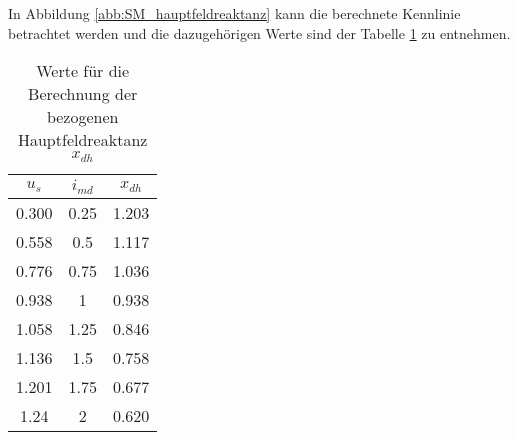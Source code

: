 In Abbildung \ref{abb:SM_hauptfeldreaktanz} kann die berechnete Kennlinie betrachtet werden und die dazugehörigen Werte sind der Tabelle \ref{tab:Hauptfeldreaktanz} zu entnehmen.



\begin{table}[!ht]
\centering
\begin{tabular}{|c|c|c|}
\hline
$u_s$    & $i_{md}$    & $x_{dh}$  \\ \hline
0.300    & 0.25     & 1.203     \\ \hline
0.558    & 0.5      & 1.117     \\ \hline
0.776    & 0.75     & 1.036     \\ \hline
0.938    & 1        & 0.938     \\ \hline
1.058    & 1.25     & 0.846     \\ \hline
1.136    & 1.5      & 0.758     \\ \hline
1.201    & 1.75     & 0.677     \\ \hline
1.24    & 2        & 0.620   \\ \hline
\end{tabular}
\caption{Werte für die Berechnung der bezogenen Hauptfeldreaktanz $x_{dh}$}
\label{tab:Hauptfeldreaktanz}

\end{table}


